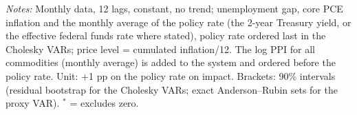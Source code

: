 \begin{table}[tp]\centering\footnotesize\setlength{\tabcolsep}{2.4pt}
\caption{Standard Methods with a Commodity Price Index in the First Block}\label{tab:standardcom}
\begin{flushleft}\footnotesize\textit{Notes:} Monthly data, 12 lags, constant, no trend; unemployment gap, core PCE inflation and the monthly average of the policy rate (the 2-year Treasury yield, or the effective federal funds rate where stated), policy rate ordered last in the Cholesky VARs; price level = cumulated inflation/12. The log PPI for all commodities (monthly average) is added to the system and ordered before the policy rate. Unit: +1 pp on the policy rate on impact. Brackets: 90\% intervals (residual bootstrap for the Cholesky VARs; exact Anderson--Rubin sets for the proxy VAR). $^{*}$ = excludes zero.\end{flushleft}
\end{table}
